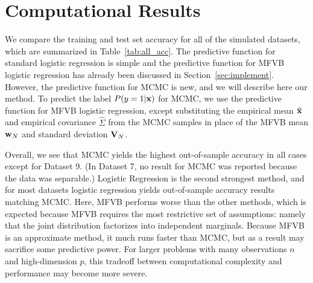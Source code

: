 
\section{Computational Results}\label{sec:comp}

We compare the training and test set accuracy for all of the simulated datasets, which are summarized in Table~\ref{tab:all_acc}.
The predictive function for standard logistic regression is simple and the predictive function for MFVB logistic regression has already been discussed in Section~\ref{sec:implement}.  However, the predictive function for MCMC is new, and we will describe here our method.  To predict the label $P(y=1|\boldsymbol{\mathbf{x}})$ for MCMC, we use the predictive function for MFVB logistic regression, except substituting the empirical mean $\boldsymbol{\mathbf{\bar x}}$ and empirical covariance ${\hat \Sigma}$ from the MCMC samples in place of the MFVB mean $\boldsymbol{\mathbf{w}}_N$ and standard deviation $\boldsymbol{\mathbf{V}}_N$.
 
Overall, we see that MCMC yields the highest out-of-sample accuracy in all cases except for Dataset 9.  (In Dataset 7, no result for
MCMC was reported because the data was separable.)  Logistic Regression is the second strongest method, and for most datasets logistic regression yields out-of-sample accuracy results matching MCMC.  Here, MFVB performs worse than the other methods, which is expected because MFVB requires the most restrictive set of assumptions: namely that the joint distribution factorizes into independent marginals.  Because MFVB is an approximate method, it much runs faster than MCMC, but as a result may sacrifice some predictive power.  For larger problems with many observations $n$ and high-dimension $p$, this tradeoff between computational complexity and performance may become more severe.  


